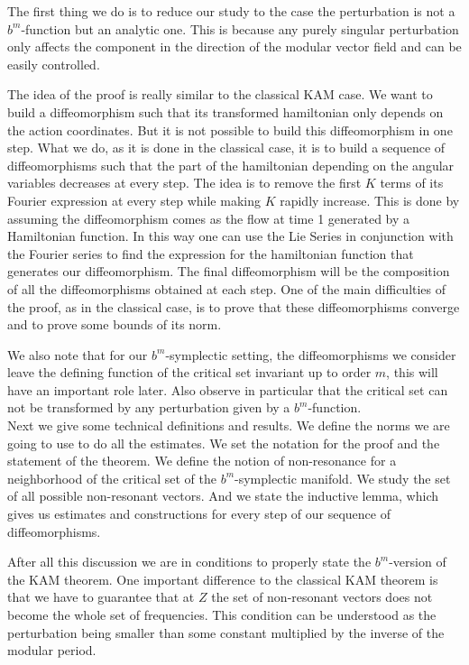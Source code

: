 The first thing we do is to reduce our study to the case the perturbation is not a $b^m$-function but an analytic one. This is because any purely singular perturbation only affects the component in the direction of the modular vector field and can be easily controlled.

The idea of the proof is really similar to the classical KAM case.
We want to build a diffeomorphism such that its transformed hamiltonian only depends on the action coordinates. But it is not possible to build this diffeomorphism in one step. What we do, as it is done in the classical case, it is to build a sequence of diffeomorphisms such that the part of the hamiltonian depending on the angular variables decreases at every step. The idea is to remove the first $K$ terms of its Fourier expression at every step while making $K$ rapidly increase. This is done by assuming the diffeomorphism comes as the flow at time 1 generated by a Hamiltonian function. In this way one can use the Lie Series in conjunction with the Fourier series to find the expression for the hamiltonian function that generates our diffeomorphism. The final diffeomorphism will be the composition of all the diffeomorphisms obtained at each step. One of the main difficulties of the proof, as in the classical case, is to prove that these diffeomorphisms converge and to prove some bounds of its norm.

We also note that for our $b^m$-symplectic setting, the diffeomorphisms we consider leave the defining function of the critical set invariant up to order $m$, this will have an important role later. Also observe in particular that the critical set can not be transformed by any perturbation given by a $b^m$-function.\\
Next we give some technical definitions and results. We define the norms we are going to use to do all the estimates. We set the notation for the proof and the statement of the theorem. We define the notion of non-resonance for a neighborhood of the critical set of the $b^m$-symplectic manifold. We study the set of all possible non-resonant vectors. And we state the inductive lemma, which gives us estimates and constructions for every step of our sequence of diffeomorphisms.

After all this discussion we are in conditions to properly state the $b^m$-version of the KAM theorem. One important difference to the classical KAM theorem is that we have to guarantee that at $Z$ the set of non-resonant vectors does not become the whole set of frequencies. This condition can be understood as the perturbation being smaller than some constant multiplied by the inverse of the modular period.

